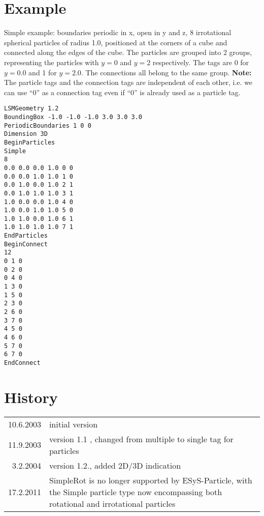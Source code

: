 \documentclass{article}
\begin{document}
\section{Example}
Simple example: boundaries periodic in x, open in y and z, 8 irrotational spherical particles of radius 1.0, positioned at the corners of a cube and connected along the edges of the cube. The particles are grouped into 2 groups, representing the particles with $y=0$ and $y=2$ respectively. The tags are 0 for $y=0.0$ and 1 for $y=2.0$. The connections all belong to the same group. \textbf{Note:} The particle tags and the connection tags are independent of each other, i.e. we can use ``0'' as a connection tag even if ``0'' is already used as a particle tag. 
\begin{verbatim}
LSMGeometry 1.2
BoundingBox -1.0 -1.0 -1.0 3.0 3.0 3.0
PeriodicBoundaries 1 0 0
Dimension 3D
BeginParticles
Simple
8
0.0 0.0 0.0 1.0 0 0
0.0 0.0 1.0 1.0 1 0
0.0 1.0 0.0 1.0 2 1
0.0 1.0 1.0 1.0 3 1 
1.0 0.0 0.0 1.0 4 0
1.0 0.0 1.0 1.0 5 0
1.0 1.0 0.0 1.0 6 1 
1.0 1.0 1.0 1.0 7 1 
EndParticles
BeginConnect
12
0 1 0
0 2 0
0 4 0
1 3 0
1 5 0
2 3 0
2 6 0
3 7 0
4 5 0
4 6 0
5 7 0
6 7 0
EndConnect
\end{verbatim}


\section{History}
\begin{tabular}{|r|l|}
\hline
10.6.2003 & initial version \\
11.9.2003 & version 1.1 , changed from multiple to single tag for particles \\
3.2.2004 & version 1.2., added 2D/3D indication \\
17.2.2011 & SimpleRot is no longer supported by ESyS-Particle, with the Simple particle type now encompassing both rotational and irrotational particles
\hline
\end{tabular}
\end{document}
